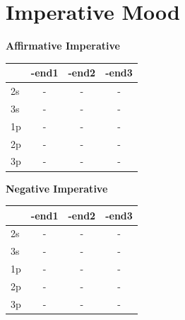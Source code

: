 \documentclass{book}
\begin{document}
\section{Imperative Mood}

\noindent
\begin{minipage}{0.32\textwidth}
\centering
\textbf{Affirmative Imperative} \\ \vspace{0.1cm}
\begin{tabular}{lccc} \toprule & -end1 & -end2 & -end3 \\ \midrule 2s & - & - & - \\ 3s & - & - & - \\ 1p & - & - & - \\ 2p & - & - & - \\ 3p & - & - & - \\ \bottomrule \end{tabular}
\end{minipage}\hfill
\begin{minipage}{0.32\textwidth}
\centering
\textbf{Negative Imperative} \\ \vspace{0.1cm}
\begin{tabular}{lccc} \toprule & -end1 & -end2 & -end3 \\ \midrule 2s & - & - & - \\ 3s & - & - & - \\ 1p & - & - & - \\ 2p & - & - & - \\ 3p & - & - & - \\ \bottomrule \end{tabular}
\end{minipage}\hfill
\begin{minipage}{0.32\textwidth}
\end{minipage}
\end{document}
